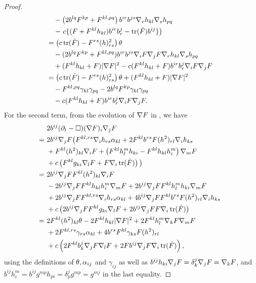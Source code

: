 \documentclass{amsart}
\begin{document}
\begin{proof}
\begin{equation}
\begin{split}
& \quad - \left(2b^{lq}F^{kp} + F^{kl,pq}\right) b^{ir}b^{js} \nabla_r h_{kl} \nabla_s h_{pq} \\
& \quad - \left. c \{(F + F^{kl}h_{kl}) b^{ir}b^{j}_{r} - \operatorname{tr}(\dot{F}) b^{ij}\}\right) \\
&= \left(c\operatorname{tr}(\dot{F}) - F^{rs}(h)^2_{rs}\right) \theta\\ & \quad - (2b^{lq}F^{kp} + F^{kl,pq}) b^{ir}b^{js}\nabla_iF\nabla_jF\nabla_rh_{kl}\nabla_s h_{pq} \\
&\quad + (F^{kl}h_{kl} + F)|\nabla F|^{2} - c(F^{kl}h_{kl} + F)b^{ir}b^{j}_{r}\nabla_i F\nabla_jF \\
&= \left(c\operatorname{tr}(\dot{F}) - F^{rs}(h)^2_{rs}\right) \theta  + (F^{kl}h_{kl} + F)|\nabla F|^{2} \\
&\quad - F^{kl,pq} \gamma_{kl} \gamma_{pq} - 2b^{lq}F^{kp} \gamma_{kl} \gamma_{pq}  \\
&\quad -c(F^{kl}h_{kl} + F)b^{ir}b^{j}_{r}\nabla_i F\nabla_jF.
\end{split}
\end{equation}
For the second term, from the evolution of \(\nabla F\) in , we have
\begin{equation}
\label{eq:delt_theta2}
\begin{split}
&2 b^{ij} (\partial_{t} - \Box) (\nabla F)_i \nabla_jF\\
=\ &2 b^{ij} \nabla_jF \big(F^{kl,rs}\nabla_i h_{rs} \alpha_{kl} + 2 F^{kl} b^{rs} F(h^2)_{rl} \nabla_i h_{ks}  \\
\quad &+ F^{kl}(h^2)_{kl}\nabla_i F + \left(F^{kl}h^{m}_{l}h_{ki} - F^{kl}h_{kl}h^{m}_{i}\right) \nabla_m F\\
\quad &+ c\left(F^{kl}g_{ki} \nabla_l F + F \nabla_i \operatorname{tr}(\dot{F})\right)\big) \\
=\ &2 b^{ij} \nabla_jF F^{kl}(h^2)_{kl}\nabla_i F \\
\quad &- 2 b^{ij} \nabla_jF F^{kl}h_{kl}h^{m}_{i} \nabla_m F + 2 b^{ij} \nabla_jF F^{kl}h^{m}_{l}h_{ki} \nabla_m F \\
\quad &+ 2 b^{ij} \nabla_jF F^{kl,rs}\nabla_i h_{rs} \alpha_{kl}  + 4 b^{ij} \nabla_jF F^{kl} b^{rs} F(h^2)_{rl} \nabla_i h_{ks} \\
\quad &+ c\left(2 b^{ij} \nabla_jF F^{kl}g_{ki} \nabla_l F + 2 b^{ij} \nabla_jF F \nabla_i \operatorname{tr}(\dot{F})\right) \\
=\ &2 F^{kl}(h^2)_{kl}\theta - 2 F^{kl}h_{kl} |\nabla F|^2 + 2 F^{kl} h^{m}_{l} \nabla_kF \nabla_m F \\
\quad &+ 2 F^{kl,rs} \gamma_{rs} \alpha_{kl} + 4 b^{rs} F^{kl} \gamma_{ks} F(h^2)_{rl} \\
\quad &+ c\left(2 F^{kl} b^j_k \nabla_jF \nabla_l F + 2 F b^{ij} \nabla_jF \nabla_i \operatorname{tr}(\dot{F})\right),
\end{split}
\end{equation}
using the definitions of \(\theta, \alpha_{ij}\) and \(\gamma_{ij}\) as well as \(b^{ij}h_{ki} \nabla_j F = \delta^j_k \nabla_j F = \nabla_k F\), and \(b^{ij} h^m_i = b^{ij} g^{mp}h_{pi} = \delta^j_p g^{mp} = g^{mj}\) in the last equality.


\end{proof}
\end{document}
